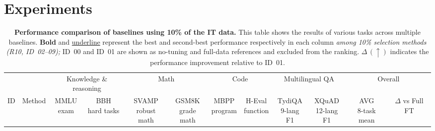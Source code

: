 \section{Experiments}
\label{sec:experiments}

\begin{table}[t]
\centering
\begin{threeparttable}
\caption{\textbf{Performance comparison of baselines using 10\% of
the IT data.} This table shows the results of various tasks across
multiple baselines. \textbf{Bold} and \underline{underline} represent the best and 
second-best performance respectively in each column 
\emph{among 10\% selection methods (R10, ID~02--09);} ID~00 and
ID~01 are shown as no-tuning and full-data references and excluded
from the ranking. $\Delta\,(\uparrow)$ indicates the performance improvement
relative to ID~01.}
\label{tab:main-results}
\small
\setlength{\tabcolsep}{2.9pt}
\renewcommand{\arraystretch}{1.01}

\begin{tabular}{@{}llcccccccccc@{}}
\toprule
 & &
 \multicolumn{2}{c}{Knowledge \& reasoning} &
 \multicolumn{2}{c}{Math} &
 \multicolumn{2}{c}{Code} &
 \multicolumn{2}{c}{Multilingual QA} &
 \multicolumn{2}{c}{Overall} \\
\cmidrule(lr){3-4}
\cmidrule(lr){5-6}
\cmidrule(lr){7-8}
\cmidrule(lr){9-10}
\cmidrule(lr){11-12}
ID & Method
& \shortstack[c]{MMLU\\[-1pt]{\scriptsize exam}}
& \shortstack[c]{BBH\\[-1pt]{\scriptsize hard tasks}}
& \shortstack[c]{SVAMP\\[-1pt]{\scriptsize robust math}}
& \shortstack[c]{GSM8K\\[-1pt]{\scriptsize grade math}}
& \shortstack[c]{MBPP\\[-1pt]{\scriptsize program}}
& \shortstack[c]{H-Eval\\[-1pt]{\scriptsize function}}
& \shortstack[c]{TydiQA\\[-1pt]{\scriptsize 9-lang F1}}
& \shortstack[c]{XQuAD\\[-1pt]{\scriptsize 12-lang F1}}
& \shortstack[c]{AVG\\[-1pt]{\scriptsize 8-task mean}}
& \shortstack[c]{$\Delta$\\[-1pt]{\scriptsize vs Full FT}} \\
\midrule


\end{tabular}
\end{threeparttable}
\end{table}
